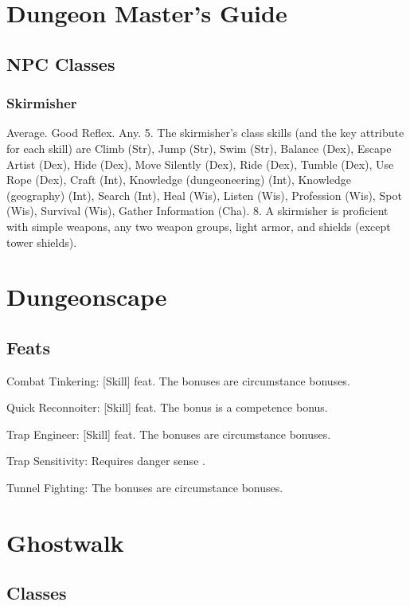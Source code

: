 \section{Dungeon Master's Guide}
\subsection{NPC Classes}
\subsubsection{Skirmisher}
 Average.
 Good Reflex.
 Any.
 5.
 The skirmisher's class skills (and the key attribute for each skill) are Climb (Str), Jump (Str), Swim (Str), Balance (Dex), Escape Artist (Dex), Hide (Dex), Move Silently (Dex), Ride (Dex), Tumble (Dex), Use Rope (Dex), Craft (Int), Knowledge (dungeoneering) (Int), Knowledge (geography) (Int), Search (Int), Heal (Wis), Listen (Wis), Profession (Wis), Spot (Wis), Survival (Wis), Gather Information (Cha).
 8.
 A skirmisher is proficient with simple weapons, any two weapon groups, light armor, and shields (except tower shields).

\section{Dungeonscape}
\subsection{Feats}
\begin{itemize*}
\item Combat Tinkering: [Skill] feat. The bonuses are circumstance bonuses.
\item Quick Reconnoiter: [Skill] feat. The bonus is a competence bonus.
\item Trap Engineer: [Skill] feat. The bonuses are circumstance bonuses.
\item Trap Sensitivity: Requires danger sense .
\item Tunnel Fighting: The bonuses are circumstance bonuses.
\end{itemize*}

\section{Ghostwalk}
\subsection{Classes}
